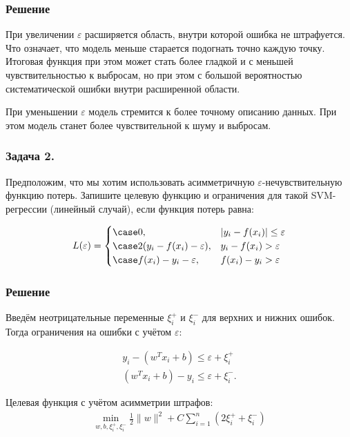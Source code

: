 \subsubsection*{Решение}
При увеличении \(\varepsilon\) расширяется область, внутри которой ошибка не штрафуется. Что означает, что модель меньше старается подогнать точно каждую точку. Итоговая функция при этом может стать более гладкой и с меньшей чувствительностью к выбросам, но при этом с большой вероятностью систематической ошибки внутри расширенной области.

При уменьшении \(\varepsilon\) модель стремится к более точному описанию данных. При этом модель станет более чувствительной к шуму и выбросам.

\subsubsection{Задача 2.}
Предположим, что мы хотим использовать асимметричную \(\varepsilon\)-нечувствительную функцию потерь. Запишите целевую функцию и ограничения для такой SVM-регрессии (линейный случай), если функция потерь равна:

\begin{align*}
    L(\varepsilon) = 
    \begin{cases}
            \case 0, & | y_i - f(x_i) | \leq \varepsilon \\
            \case 2(y_i - f(x_i) - \varepsilon), & y_i - f(x_i) > \varepsilon \\
            \case f(x_i) - y_i- \varepsilon, & f(x_i) - y_i > \varepsilon
        \end{cases}
\end{align*}

\subsubsection{Решение}
Введём неотрицательные переменные \(\xi_i^+\) и \(\xi_i^-\) для верхних и нижних ошибок. Тогда ограничения на ошибки с учётом \(\varepsilon\):

\begin{align*}
    y_i - (w^Tx_i + b) \leq \varepsilon + \xi_i^+\\
    (w^Tx_i + b) - y_i \leq \varepsilon + \xi_i^-.
\end{align*}

Целевая функция с учётом асимметрии штрафов:
\begin{align*}
    \min_{w, b, \xi_i^+, \xi_i^-} \frac{1}{2} \| w \|^2 + C \sum\limits_{i = 1}^n (2\xi_i^+ + \xi_i^-)
\end{align*}

